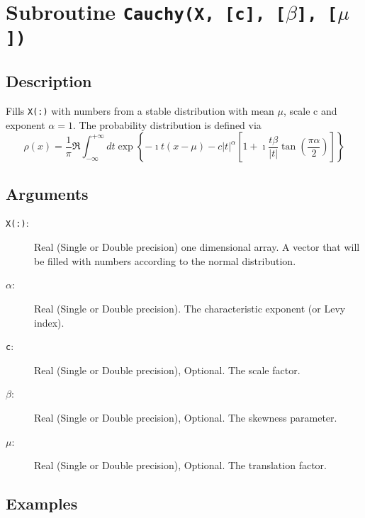 \section{Subroutine \texttt{Cauchy(X, [c], [$\beta$], [$\mu$])}}

\subsection{Description}

Fills \texttt{X(:)} with numbers from a stable distribution with
mean $\mu$, scale c and exponent $\alpha=1$. The probability
distribution is defined via
\begin{equation}
  \rho(x) = \frac{1}{\pi} \Re\int_{-\infty}^{+\infty} dt 
  \exp\left\{ -\imath t (x-\mu) - c|t|^\alpha\left[1+\imath\frac{t\beta}{|t|}\tan\left(\frac{\pi\alpha}{2}\right)\right] \right\}
\end{equation}

\subsection{Arguments}

\begin{description}
\item[\texttt{X(:)}:] Real (Single or Double precision) one
  dimensional array. A vector that will be filled with numbers
  according to the normal distribution.
\item[$\alpha$:] Real (Single or Double precision). The
  characteristic exponent (or Levy index).
\item[\texttt{c}:] Real (Single or Double precision), Optional. The
  scale factor.
\item[$\beta$:] Real (Single or Double precision), Optional. The 
  skewness parameter.
\item[$\mu$:] Real (Single or Double precision), Optional. The 
  translation factor.
\end{description}

\subsection{Examples}

